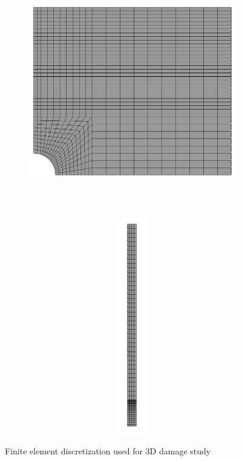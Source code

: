 \documentclass[a4paper,12pt,twoside]{report}
\begin{document}
\begin{figure}[htbp!]
	\centering
       \captionsetup[subfigure]{justification=centering}
     \begin{subfigure}{0.5\textwidth}
     	\centering
         \includegraphics[width=10cm,height=10cm,keepaspectratio]{27.Mesh.png}
         \label{fig:plate with hole mesh 1}
     \end{subfigure}
    \hspace{2.5cm}
     \captionsetup[subfigure]{justification=centering}
     \begin{subfigure}{0.3\textwidth}
     \centering
         \includegraphics[width=9cm,height=9.5cm,keepaspectratio]{27.Mesh2.png}
         \label{fig:plate with hole mesh 2}
         \end{subfigure}
          \caption{Finite element discretization used for 3D damage study}
        \label{fig:plate with hole mesh} 
\end{figure}
\end{document}
